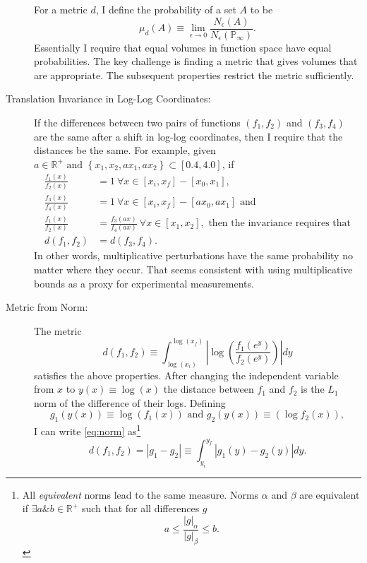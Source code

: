 \documentclass[]{article}
\newcommand{\field}[1]{\mathbb{#1}}
\newcommand\REAL{\field{R}}
\newcommand\Polytope[1]{\field{P}_{#1}}
\newcommand\PolytopeInf{\Polytope{\infty}}
\begin{document}
\begin{description}
    For a metric $d$, I define the probability of a set $A$ to be
    \begin{equation}
      \label{eq:MeasMetric}
      \mu_d(A) \equiv \lim_{\epsilon \rightarrow 0}
      \frac{N_\epsilon(A)}{N_\epsilon(\PolytopeInf)}.
    \end{equation}
    Essentially I require that equal volumes in function space have
    equal probabilities.  The key challenge is finding a metric that
    gives volumes that are appropriate.  The subsequent properties
    restrict the  metric sufficiently.
  \item[Translation Invariance in Log-Log Coordinates:] If the
    differences between two pairs of functions $(f_1, f_2)$ and $(f_3,
    f_4)$ are the same after a shift in log-log coordinates, then I
    require that the distances be the same.  For example, given $a \in
    \REAL^+ \text{ and } \left\{ x_1, x_2, ax_1, ax_2 \right\} \subset
    [0.4,4.0]$, if
    \begin{align*}
      \frac{f_1(x)}{f_2(x)} &= 1 ~\forall x\in[x_i,x_f] - [x_0,x_1],  \\
      \frac{f_3(x)}{f_4(x)} &= 1 ~\forall x\in[x_i,x_f] - [a x_0,a
      x_1] \text{ and} \\
      \frac{f_1(x)}{f_2(x)} &= \frac{f_3(ax)}{f_4(ax)}~ \forall
      x\in[x_1,x_2],
      \text{ then the invariance requires that}\\
      d(f_1, f_2) &= d(f_3, f_4).
    \end{align*}
    In other words, multiplicative perturbations have the same
    probability no matter where they occur.  That seems consistent
    with using multiplicative bounds as a proxy for experimental
    measurements.
  \item[Metric from Norm:] The metric
    \begin{equation}
      \label{eq:norm}
      d(f_1,f_2) \equiv \int_{\log(x_i)}^{\log(x_f)} \left| \log
        \left( \frac{f_1(e^y)}{f_2(e^y)} \right) \right| dy
    \end{equation}
    satisfies the above properties.  After changing the independent
    variable from $x$ to $y(x) \equiv \log(x)$ the distance between
    $f_1$ and $f_2$ is the $L_1$ norm of the difference of their logs.
    Defining
    \begin{equation*}
     g_1(y(x)) \equiv \log \left( f_1(x) \right) \text{ and }
     g_2(y(x)) \equiv \left( \log f_2(x) \right),
    \end{equation*}
    I can write \eqref{eq:norm} as\footnote{
    All \emph{equivalent} norms lead to the same measure.  Norms
    $\alpha$ and $\beta$ are equivalent if $\exists a \& b \in \REAL^+$
    such that for all differences $g$
       \begin{equation*}
         a \leq \frac{\left|g\right|_\alpha}{\left|g\right|_\beta} \leq
         b .
       \end{equation*}
     }
    \begin{equation*}
      d(f_1,f_2) = |g_1 - g_2| \equiv \int_{y_i}^{y_f} \left|
        g_1(y)-g_2(y) \right| dy.
    \end{equation*}
\end{description}
\end{document}
